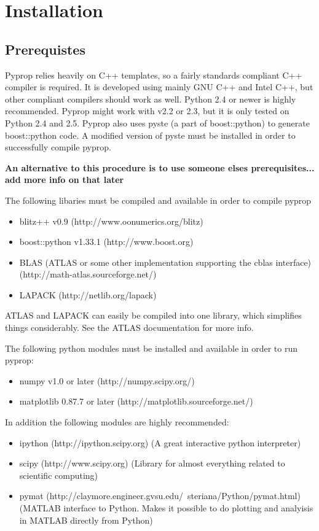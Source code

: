 
\chapter{Installation}
\section{Prerequistes}
Pyprop relies heavily on C++ templates, so a fairly standards compliant C++ compiler is required.
It is developed using mainly GNU C++ and Intel C++, but other compliant compilers should work as well.
Python 2.4 or newer is highly recommended. Pyprop might work with v2.2 or 2.3, but it is only tested on
Python 2.4 and 2.5. Pyprop also uses pyste (a part of boost::python) to generate boost::python code. 
A modified version of pyste must be installed in order to successfully compile pyprop.

\textbf{An alternative to this procedure is to use someone elses prerequisites... add more info on that later}

The following libaries must be compiled and available in order to compile pyprop
\begin{itemize}
\item blitz++ v0.9 (http://www.oonumerics.org/blitz)
\item boost::python v1.33.1 (http://www.boost.org)
\item BLAS (ATLAS or some other implementation supporting the cblas interface) (http://math-atlas.sourceforge.net/)
\item LAPACK (http://netlib.org/lapack)
\end{itemize}
ATLAS and LAPACK can easily be compiled into one library, which simplifies things considerably. See the ATLAS documentation
for more info.

The following python modules must be installed and available in order to run pyprop:
\begin{itemize}
\item numpy v1.0 or later (http://numpy.scipy.org/)
\item matplotlib 0.87.7 or later (http://matplotlib.sourceforge.net/)
\end{itemize}
	
In addition the following modules are highly recommended:
\begin{itemize}
\item ipython (http://ipython.scipy.org) (A great interactive python interpreter)
\item scipy (http://www.scipy.org) (Library for almost everything related to scientific computing)
\item pymat (http://claymore.engineer.gvsu.edu/~steriana/Python/pymat.html) (MATLAB interface to Python. 
	Makes it possible to do plotting and analyisis in MATLAB directly from Python)
\end{itemize}

